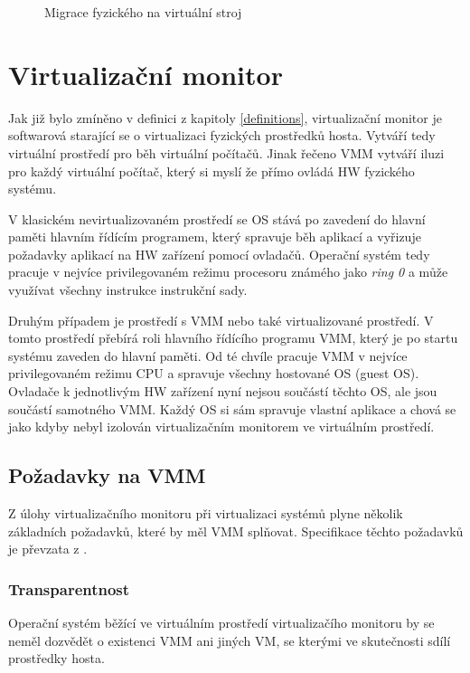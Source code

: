 \begin{figure}
    \centering    
    \caption{Migrace fyzického na virtuální stroj}
    \label{migration2}
\end{figure}

\section{Virtualizační monitor}
\label{section:vmm}

Jak již bylo zmíněno v definici z kapitoly \ref{definitions}, virtualizační monitor je softwarová starající se o virtualizaci fyzických prostředků hosta. Vytváří tedy virtuální prostředí pro běh virtuální počítačů.
Jinak řečeno VMM vytváří iluzi pro každý virtuální počítač, který si myslí že přímo ovládá HW fyzického systému.

V klasickém nevirtualizovaném prostředí se OS stává po zavedení do hlavní paměti hlavním řídícím programem, který spravuje běh aplikací a vyřizuje požadavky aplikací na HW zařízení pomocí ovladačů. Operační systém tedy pracuje
v nejvíce privilegovaném režimu procesoru známého jako \textit{ring 0} a může využívat všechny instrukce instrukční sady.

Druhým případem je prostředí s VMM nebo také virtualizované prostředí. V tomto prostředí přebírá roli hlavního řídícího programu VMM, který je po startu systému zaveden do hlavní paměti. Od té chvíle pracuje VMM v nejvíce privilegovaném
režimu CPU a spravuje všechny hostované OS (guest OS). Ovladače k jednotlivým HW zařízení nyní nejsou součástí těchto OS, ale jsou součástí samotného VMM. Každý OS si sám spravuje vlastní aplikace a chová se jako kdyby nebyl izolován virtualizačním monitorem
ve virtuálním prostředí.\cite{vmm1}

\subsection{Požadavky na VMM}

Z úlohy virtualizačního monitoru při virtualizaci systémů plyne několik základních požadavků, které by měl VMM splňovat. Specifikace těchto požadavků je převzata z \cite{virt2}.

\subsubsection*{Transparentnost}

Operační systém běžící ve virtuálním prostředí virtualizačího monitoru by se neměl dozvědět o existenci VMM ani jiných VM, se kterými ve skutečnosti sdílí prostředky hosta.

